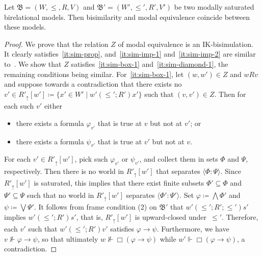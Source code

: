\documentclass[submission,copyright,creativecommons]{eptcs}
\newcommand{\mo}{\mathfrak}
\newcommand{\B}{\mo{B}}
\newcommand{\Zin}[2]{(#1,#2)\in Z}
\newcommand{\ac}{R}
\renewcommand{\phi}{\varphi}
\newcommand{\consec}[2]{\langle #1:#2 \rangle}
\begin{document}
\begin{theorem}\label{thm:hm}
  Let $\B = (W, \leq, \ac, V)$ and $\B' = (W', \leq', \ac', V')$ be two modally
  saturated birelational models. Then bisimilarity and modal equivalence
  coincide between these models.
\end{theorem}
\begin{proof}
  We prove that the relation $Z$ of modal equivalence  is an IK-bi\-si\-mu\-la\-tion.
  It clearly satisfies~\eqref{it:sim-prop},
  and~\eqref{it:sim-imp-1} and~\eqref{it:sim-imp-2} are similar
  to~\cite[Theorem~21]{Pat97}.
  We show that $Z$ satisfies~\eqref{it:sim-box-1} and~\eqref{it:sim-diamond-1},
  the remaining conditions being similar.
%
  For~\eqref{it:sim-box-1}, let $\Zin{w}{w'}$ and $w \ac v$
  and suppose towards a contradiction that there exists no
  $v' \in \ac'_{\uparrow}[w'] \coloneq \{ x' \in W' \mid w'({\leq'} \mathrel{;} \ac')x' \}$
  such that $\Zin{v}{v'}$.
%
  Then for each such $v'$ either
  \begin{itemize}\itemsep0pt
    \item there exists a formula $\phi_{v'}$ that is true at $v$ but not at $v'$; or
    \item there exists a formula $\psi_{v'}$ that is true at $v'$ but not at $v$.
  \end{itemize}
  For each $v' \in \ac'_{\uparrow}[w']$,
  pick such $\phi_{v'}$ or $\psi_{v'}$, and collect them in
  sets $\Phi$ and $\Psi$, respectively.
  Then there is no world in $\ac'_{\uparrow}[w']$ that
  separates $\consec{\Phi}{\Psi}$.
  Since $\ac'_{\uparrow}[w']$ is saturated, this implies that there exist
  finite subsets $\Phi' \subseteq \Phi$ and $\Psi' \subseteq \Psi$ such that
  no world in $\ac'_{\uparrow}[w']$ separates $\consec{\Phi'}{\Psi'}$.
  Set $\phi \coloneq \bigwedge \Phi'$ and $\psi \coloneq \bigvee \Psi'$.
%
  It follows from frame condition (2) on $\B'$ 
  that $w' ({\leq'} \mathrel{;} \ac' \mathrel{;} {\leq'}) s'$ implies
  $w' ({\leq'} \mathrel{;} {\ac'}) s'$, that is, $R'_\uparrow[w']$ is upward-closed under~$\leq'$.
  Therefore, each $v'$ such that
  $w' ({\leq'} \mathrel{;} {\ac'}) v'$ satisfies $\phi \to \psi$.
  Furthermore, we have $v \not\Vdash \phi \to \psi$, so that ultimately $w \not\Vdash \Box(\phi \to \psi)$ while $w' \Vdash \Box(\phi \to \psi)$, a contradiction.


\end{proof}
\end{document}
